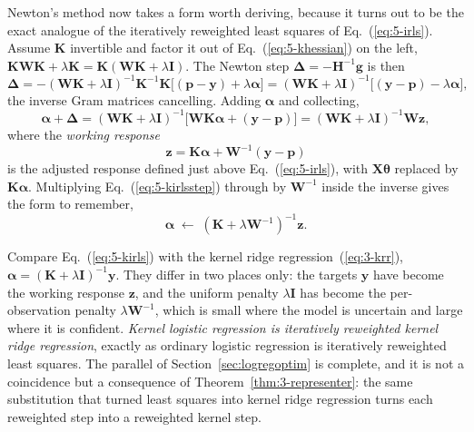 Newton's method now takes a form worth deriving, because it turns out to be the
exact analogue of the iteratively reweighted least squares of
Eq.~(\ref{eq:5-irls}).  Assume $\bm{K}$ invertible and factor it out of
Eq.~(\ref{eq:5-khessian}) on the left,
$\bm{K}\bm{W}\bm{K}+\lambda\bm{K}=\bm{K}(\bm{W}\bm{K}+\lambda\bm{I})$.  The
Newton step $\bm{\Delta}=-\bm{H}^{-1}\bm{g}$ is then
\begin{equation}
  \bm{\Delta}
   = -\left(\bm{W}\bm{K}+\lambda\bm{I}\right)^{-1}\bm{K}^{-1}
      \bm{K}\Big[(\bm{p}-\bm{y})+\lambda\bm{\alpha}\Big]
   = \left(\bm{W}\bm{K}+\lambda\bm{I}\right)^{-1}
     \Big[(\bm{y}-\bm{p})-\lambda\bm{\alpha}\Big],
  \label{eq:5-knewtonstep}
\end{equation}
the inverse Gram matrices cancelling.  Adding $\bm{\alpha}$ and collecting,
\begin{equation}
  \bm{\alpha}+\bm{\Delta}
   = \left(\bm{W}\bm{K}+\lambda\bm{I}\right)^{-1}
     \Big[\bm{W}\bm{K}\bm{\alpha}+(\bm{y}-\bm{p})\Big]
   = \left(\bm{W}\bm{K}+\lambda\bm{I}\right)^{-1}\bm{W}\bm{z},
  \label{eq:5-kirlsstep}
\end{equation}
where the \emph{working response}
\begin{equation}
  \bm{z} = \bm{K}\bm{\alpha}+\bm{W}^{-1}\left(\bm{y}-\bm{p}\right)
  \label{eq:5-kworking}
\end{equation}
is the adjusted response defined just above Eq.~(\ref{eq:5-irls}), with $\bm{X}\bm{\theta}$ replaced by
$\bm{K}\bm{\alpha}$.  Multiplying Eq.~(\ref{eq:5-kirlsstep}) through by
$\bm{W}^{-1}$ inside the inverse gives the form to remember,
\begin{equation}
  \boxed{\;
  \bm{\alpha} \;\leftarrow\;
    \left(\bm{K}+\lambda\bm{W}^{-1}\right)^{-1}\bm{z} . \;}
  \label{eq:5-kirls}
\end{equation}

Compare Eq.~(\ref{eq:5-kirls}) with the kernel ridge
regression~(\ref{eq:3-krr}), $\bm{\alpha}=(\bm{K}+\lambda\bm{I})^{-1}\bm{y}$.
They differ in two places only: the targets $\bm{y}$ have become the working
response $\bm{z}$, and the uniform penalty $\lambda\bm{I}$ has become the
per-observation penalty $\lambda\bm{W}^{-1}$, which is small where the model is
uncertain and large where it is confident.  \emph{Kernel logistic regression is
iteratively reweighted kernel ridge regression}, exactly as ordinary logistic
regression is iteratively reweighted least squares.  The parallel of
Section~\ref{sec:logregoptim} is complete, and it is not a coincidence but a
consequence of Theorem~\ref{thm:3-representer}: the same substitution that
turned least squares into kernel ridge regression turns each reweighted step
into a reweighted kernel step.

